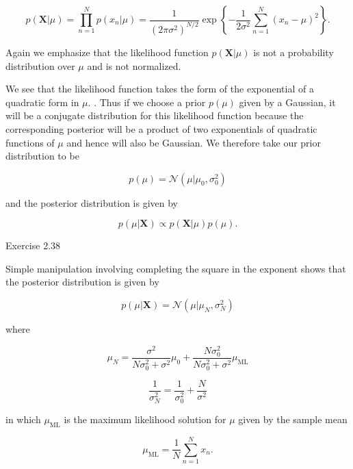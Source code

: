 \documentclass[
  10
]{article}
\begin{document}
\[
p (\mathbf {X} | \mu) = \prod_ {n = 1} ^ {N} p (x _ {n} | \mu) = \frac {1}{(2 \pi \sigma^ {2}) ^ {N / 2}} \exp \left\{- \frac {1}{2 \sigma^ {2}} \sum_ {n = 1} ^ {N} (x _ {n} - \mu) ^ {2} \right\}.\tag{2.137}
\]

Again we emphasize that the likelihood function
\(p ( \mathbf { X } | \mu )\) is not a probability distribution over
\(\mu\) and is not normalized.

We see that the likelihood function takes the form of the exponential of
a quadratic form in \(\mu .\) . Thus if we choose a prior \(p ( \mu )\)
given by a Gaussian, it will be a conjugate distribution for this
likelihood function because the corresponding posterior will be a
product of two exponentials of quadratic functions of \(\mu\) and hence
will also be Gaussian. We therefore take our prior distribution to be

\[
p (\mu) = \mathcal {N} \left(\mu | \mu_ {0}, \sigma_ {0} ^ {2}\right)\tag{2.138}
\]

and the posterior distribution is given by

\[
p (\mu | \mathbf {X}) \propto p (\mathbf {X} | \mu) p (\mu).\tag{2.139}
\]

Exercise 2.38

Simple manipulation involving completing the square in the exponent
shows that the posterior distribution is given by

\[
p (\mu | \mathbf {X}) = \mathcal {N} \left(\mu | \mu_ {N}, \sigma_ {N} ^ {2}\right)\tag{2.140}
\]

where

\[
\mu_ {N} = \frac {\sigma^ {2}}{N \sigma_ {0} ^ {2} + \sigma^ {2}} \mu_ {0} + \frac {N \sigma_ {0} ^ {2}}{N \sigma_ {0} ^ {2} + \sigma^ {2}} \mu_ {\mathrm{ML}}\tag{2.141}
\]

\[
{\frac {1}{\sigma_ {N} ^ {2}}} = {\frac {1}{\sigma_ {0} ^ {2}} + \frac {N}{\sigma^ {2}}}\tag{2.142}
\]

in which \(\mu _ { \mathrm { M L } }\) is the maximum likelihood
solution for \(\mu\) given by the sample mean

\[
\mu_ {\mathrm{ML}} = \frac {1}{N} \sum_ {n = 1} ^ {N} x _ {n}.\tag{2.143}
\]
\end{document}
